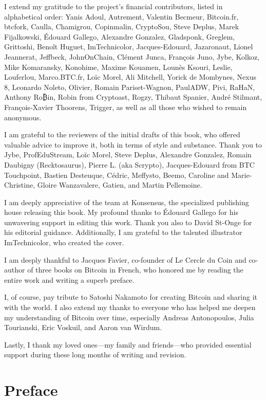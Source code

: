 \documentclass[
  a5paper,
  smalldemyvopaper,10pt,twoside,onecolumn,openright,extrafontsizes,hidelinks]{memoir}
\begin{document}
I extend my gratitude to the project's financial contributors, listed in
alphabetical order: Yanis Adoul, Autrement, Valentin Becmeur,
Bitcoin.fr, btcfork, Caulla, Chamigrou, Copinmalin, CryptoSou, Steve
Deplus, Marek Fijalkowski, Édouard Gallego, Alexandre Gonzalez,
Gladsponk, Greglem, Grittoshi, Benoît Huguet, ImTechnicolor,
Jacques-Edouard, Jazaronaut, Lionel Jeannerat, Jeffbeck, JohnOnChain,
Clément Junca, François Juno, Jybe, Kolkoz, Mike Komaransky, Konohime,
Maxime Kouamen, Lounès Ksouri, Leslie, Louferlou, Marco.BTC.fr, Loïc
Morel, Ali Mitchell, Yorick de Mombynes, Nexus 8, Leonardo Noleto,
Olivier, Romain Pariset-Wagnon, PaulADW, Pivi, RaHaN, Anthony Ro₿in,
Robin from Cryptoast, Rogzy, Thibaut Spanier, André Stilmant,
François-Xavier Thoorens, Trigger, as well as all those who wished to
remain anonymous.

I am grateful to the reviewers of the initial drafts of this book, who
offered valuable advice to improve it, both in terms of style and
substance. Thank you to Jybe, ProfEduStream, Loïc Morel, Steve Deplus,
Alexandre Gonzalez, Romain Daubigny (Recktosaurus), Pierre L. (aka
Scrypto), Jacques-Edouard from BTC Touchpoint, Bastien Desteuque,
Cédric, Meffysto, Beemo, Caroline and Marie-Christine, Gloire
Wanzavalere, Gatien, and Martin Pellemoine.

I am deeply appreciative of the team at Konsensus, the specialized
publishing house releasing this book. My profound thanks to Édouard
Gallego for his unwavering support in editing this work. Thank you also
to David St-Onge for his editorial guidance. Additionally, I am grateful
to the talented illustrator ImTechnicolor, who created the cover.

I am deeply thankful to Jacques Favier, co-founder of Le Cercle du Coin
and co-author of three books on Bitcoin in French, who honored me by
reading the entire work and writing a superb preface.

I, of course, pay tribute to Satoshi Nakamoto for creating Bitcoin and
sharing it with the world. I also extend my thanks to everyone who has
helped me deepen my understanding of Bitcoin over time, especially
Andreas Antonopoulos, Julia Tourianski, Eric Voskuil, and Aaron van
Wirdum.

Lastly, I thank my loved ones---my family and friends---who provided
essential support during these long months of writing and revision.


\chapter*{Preface}\label{avant-propos}
\end{document}
